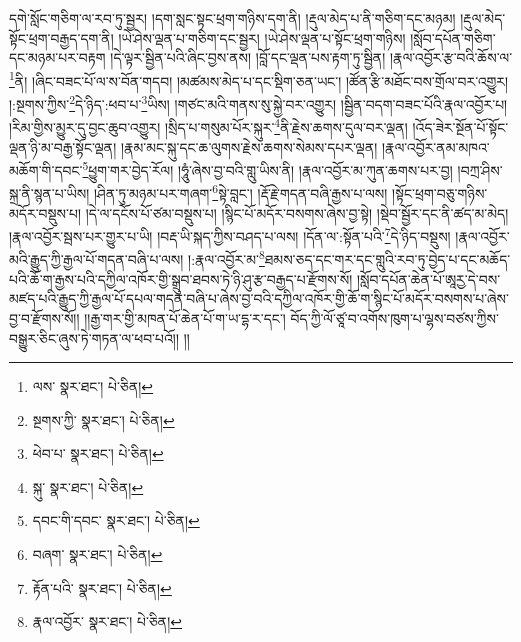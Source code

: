 དགེ་སློང་གཅིག་ལ་རབ་ཏུ་སྦྱར། །དག་སླང་སྟང་ཕྲག་གཉིས་དག་ནི། །རྡུལ་མེད་པ་ནི་གཅིག་དང་མཉམ། །རྡུལ་མེད་སྟོང་ཕྲག་བརྒྱད་དག་ནི། །ཡེ་ཤེས་ལྡན་པ་གཅིག་དང་སྦྱར། །ཡེ་ཤེས་ལྡན་པ་སྟོང་ཕྲག་གཉིས། །སློབ་དཔོན་གཅིག་དང་མཉམ་པར་བརྟག །དེ་ལྟར་སྦྱིན་པའི་ཞིང་བྱས་ནས། །བློ་དང་ལྡན་པས་རྟག་ཏུ་སྦྱིན། །རྣལ་འབྱོར་རྩ་བའི་ཆོས་ལ་\footnote{ལས་  སྣར་ཐང་།  པེ་ཅིན། }ནི། །ཞིང་བཟང་པོ་ལ་ས་བོན་གདབ། །མཚམས་མེད་པ་དང་སྡིག་ཅན་ཡང་། །ཚོན་རྩི་མཐོང་བས་གྲོལ་བར་འགྱུར། །:སྔགས་ཀྱིས་\footnote{སྔགས་ཀྱི་  སྣར་ཐང་།  པེ་ཅིན། }དེ་ཉིད་:ཕབ་པ་\footnote{ཕེབ་པ་  སྣར་ཐང་།  པེ་ཅིན། }ཡིས། །གཙང་མའི་གནས་སུ་སྐྱེ་བར་འགྱུར། །སྦྱིན་བདག་བཟང་པོའི་རྣལ་འབྱོར་པ། །རིམ་གྱིས་མྱུར་དུ་བྱང་ཆུབ་འགྱུར། །སྲིད་པ་གསུམ་པོར་སྐུར་\footnote{སྐུ་  སྣར་ཐང་།  པེ་ཅིན། }ནི་རྗེས་ཆགས་དུལ་བར་ལྡན། །འོད་ཟེར་སྔོན་པོ་སྟོང་ལྡན་ཉི་མ་བརྒྱ་སྟོང་ལྡན། །རྣམ་མང་སྐུ་དང་ཆ་ལུགས་རྗེས་ཆགས་སེམས་དཔར་ལྡན། །རྣལ་འབྱོར་ནམ་མཁའ་མཆོག་གི་དབང་\footnote{དབང་གི་དབང་  སྣར་ཐང་།  པེ་ཅིན། }ཕྱུག་གར་བྱེད་རོལ། །ཧཱུཾ་ཞེས་བྱ་བའི་གླུ་ཡིས་ནི། །རྣལ་འབྱོར་མ་ཀུན་ཆགས་པར་བྱ། །བཀྲ་ཤིས་སྐྲ་ནི་སྙན་པ་ཡིས། །ཤིན་ཏུ་མཉམ་པར་གཞག་\footnote{བཞག་  སྣར་ཐང་།  པེ་ཅིན། }སྟེ་བླང་། །རྡོ་རྗེ་གདན་བཞི་རྒྱས་པ་ལས། །སྟོང་ཕྲག་བཅུ་གཉིས་མདོར་བསྡུས་པ། །དེ་ལ་དངོས་པོ་ཙམ་བསྡུས་པ། །སྙིང་པོ་མདོར་བསགས་ཞེས་བྱ་སྟེ། །སྡེབ་སྦྱོར་དང་ནི་ཚད་མ་མེད། །རྣལ་འབྱོར་སྦས་པར་གྱུར་པ་ཡི། །བརྡ་ཡི་སྐད་ཀྱིས་བཤད་པ་ལས། །དོན་ལ་:སྟོན་པའི་\footnote{རྟོན་པའི་  སྣར་ཐང་།  པེ་ཅིན། }དེ་ཉིད་བསྡུས། །རྣལ་འབྱོར་མའི་རྒྱུད་ཀྱི་རྒྱལ་པོ་གདན་བཞི་པ་ལས། །:རྣལ་འབྱོར་མ་\footnote{རྣལ་འབྱོར་  སྣར་ཐང་།  པེ་ཅིན། }ཐམས་ཅད་དང་གར་དང་གླུའི་རབ་ཏུ་བྱེད་པ་དང་མཆོད་པའི་ཆོ་ག་རྒྱས་པའི་དཀྱིལ་འཁོར་གྱི་སྒྲུབ་ཐབས་ཏེ་ཉི་ཤུ་རྩ་བརྒྱད་པ་རྫོགས་སོ། །སློབ་དཔོན་ཆེན་པོ་ཨཱརྱ་དེ་བས་མཛད་པའི་རྒྱུད་ཀྱི་རྒྱལ་པོ་དཔལ་གདན་བཞི་པ་ཞེས་བྱ་བའི་དཀྱིལ་འཁོར་གྱི་ཆོ་ག་སྙིང་པོ་མདོར་བསགས་པ་ཞེས་བྱ་བ་རྫོགས་སོ།། །།རྒྱ་གར་གྱི་མཁན་པོ་ཆེན་པོ་ག་ཡ་དྷ་ར་དང་། བོད་ཀྱི་ལོ་ཙཱ་བ་འགོས་ཁུག་པ་ལྷས་བཙས་ཀྱིས་བསྒྱུར་ཅིང་ཞུས་ཏེ་གཏན་ལ་ཕབ་པའོ།། །།